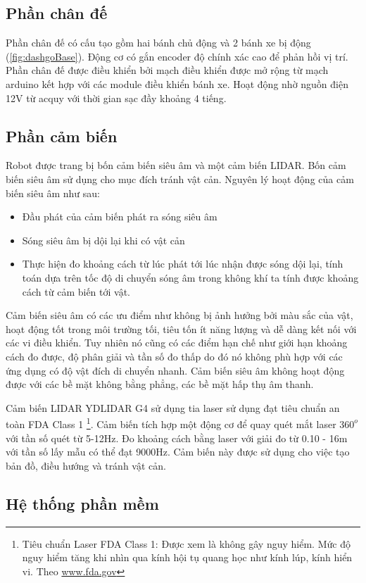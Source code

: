\subsection{Phần chân đế}
Phần chân đế có cấu tạo gồm hai bánh chủ động và 2 bánh xe bị động (\figurename{\ref{fig:dashgoBase}}). Động cơ có gắn encoder độ chính xác cao để phản hồi vị trí. Phần chân đế được điều khiển bởi mạch điều khiển được mở rộng từ mạch arduino kết hợp với các module điều khiển bánh xe. Hoạt động nhờ nguồn điện 12V từ acquy với thời gian sạc đầy khoảng 4 tiếng.

\subsection{Phần cảm biến}
Robot được trang bị bốn cảm biến siêu âm và một cảm biến LIDAR. Bốn cảm biến siêu âm sử dụng cho mục đích tránh vật cản. Nguyên lý hoạt động của cảm biến siêu âm như sau:
\begin{itemize}
    \item Đầu phát của cảm biến phát ra sóng siêu âm
    \item Sóng siêu âm bị dội lại khi có vật cản
    \item Thực hiện đo khoảng cách từ lúc phát tới lúc nhận được sóng dội lại, tính toán dựa trên tốc độ di chuyển sóng âm trong không khí ta tính được khoảng cách từ cảm biến tới vật.
\end{itemize}
Cảm biến siêu âm có các ưu điểm như không bị ảnh hưởng bởi màu sắc của vật, hoạt động tốt trong môi trường tối, tiêu tốn ít năng lượng và dễ dàng kết nối với các vi điều khiển. Tuy nhiên nó cũng có các điểm hạn chế như giới hạn khoảng cách đo được, độ phân giải và tần số đo thấp do đó nó không phù hợp với các ứng dụng có độ vật đích di chuyển nhanh. Cảm biến siêu âm không hoạt động được với các bề mặt không bằng phẳng, các bề mặt hấp thụ âm thanh.

Cảm biến LIDAR YDLIDAR G4 sử dụng tia laser sử dụng đạt tiêu chuẩn an toàn FDA Class 1 \footnote{Tiêu chuẩn Laser FDA Class 1: Được xem là không gây nguy hiểm. Mức độ nguy hiểm tăng khi nhìn qua kính hội tụ quang học như kính lúp, kính hiển vi. Theo \url{www.fda.gov}}.
Cảm biến tích hợp một động cơ để quay quét mắt laser ${360}^{o}$ với tần số quét từ 5-12Hz. Đo khoảng cách bằng laser với giải đo từ 0.10 - 16m với tần số lấy mẫu có thể đạt 9000Hz.
Cảm biến này được sử dụng cho việc tạo bản đồ, điều hướng và tránh vật cản.


\subsection{Hệ thống phần mềm}

